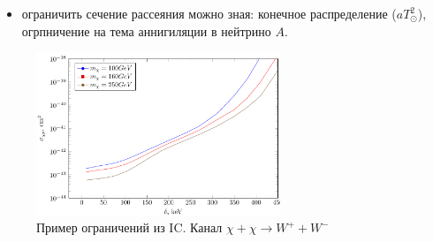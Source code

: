 \begin{itemize}
	\item ограничить сечение рассеяния можно зная: конечное распределение ($aT_{\odot}^2$), огрпничение на тема аннигиляции в нейтрино $A$. 
\end{itemize}
\begin{figure}[!h]
	\centering
	\includegraphics[width=0.65\textwidth]{images/Constrains.png}
	\caption{Пример ограничений из IC. Канал $\chi+\chi \to W^{+} + W^{-}$}
\end{figure}